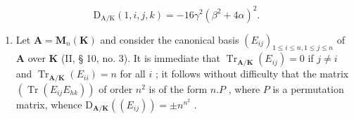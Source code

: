\[
\mathrm{D} _ {\mathrm{A/K}} (1, i, j, k) = - 16 \gamma^ {2} (\beta^ {2} + 4 \alpha) ^ {2}.
\]

\begin{enumerate}
\def\labelenumi{(\arabic{enumi})}
\setcounter{enumi}{3}
\tightlist
\item
  Let \(\mathbf{A} = \mathbf{M}_n(\mathbf{K})\) and consider the canonical basis \((E_{ij})_{1\leqslant i\leqslant n,1\leqslant j\leqslant n}\) of \(\mathbf{A}\) over \(\mathbf{K}\) (II, § 10, no. 3). It is immediate that \(\operatorname{Tr}_{\mathbf{A} / \mathbf{K}}(E_{ij}) = 0\) if \(j\neq i\) and \(\operatorname{Tr}_{\mathbf{A} / \mathbf{K}}(E_{ii}) = n\) for all \(i\) ; it follows without difficulty that the matrix \((\operatorname{Tr}(E_{ij}E_{hk}))\) of order \(n^2\) is of the form \(n.P\) , where \(P\) is a permutation matrix, whence \(\mathrm{D}_{\mathbf{A} / \mathbf{K}}((E_{ij})) = \pm n^{n^2}\) .
\end{enumerate}

